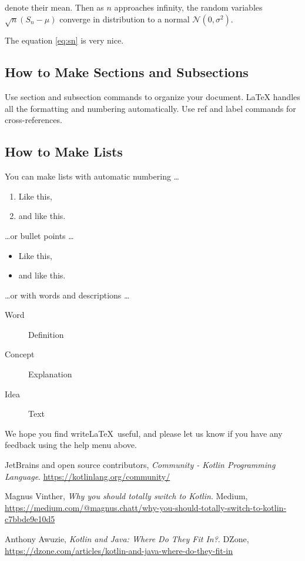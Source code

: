 \documentclass[a4paper]{article}
\begin{document}
denote their mean. Then as $n$ approaches infinity, the random variables $\sqrt{n}(S_n - \mu)$ converge in distribution to a normal $\mathcal{N}(0, \sigma^2)$.

The equation \ref{eq:sn} is very nice.

\subsection{How to Make Sections and Subsections}

Use section and subsection commands to organize your document. \LaTeX{} handles all the formatting and numbering automatically. Use ref and label commands for cross-references.

\subsection{How to Make Lists}

You can make lists with automatic numbering \dots

\begin{enumerate}
	\item Like this,
	\item and like this.
\end{enumerate}
\dots or bullet points \dots
\begin{itemize}
	\item Like this,
	\item and like this.
\end{itemize}
\dots or with words and descriptions \dots
\begin{description}
	\item[Word] Definition
	\item[Concept] Explanation
	\item[Idea] Text
\end{description}

We hope you find write\LaTeX\ useful, and please let us know if you have any feedback using the help menu above.

\begin{thebibliography}{999}
\raggedright

	JetBrains and open source contributors,
	\emph{Community - Kotlin Programming Language}.
	\url{https://kotlinlang.org/community/}

	Magnus Vinther,
	\emph{Why you should totally switch to Kotlin}. Medium,
	\url{https://medium.com/@magnus.chatt/why-you-should-totally-switch-to-kotlin-c7bbde9e10d5}

	Anthony Awuzie,
	\emph{Kotlin and Java: Where Do They Fit In?}. DZone,
	\url{https://dzone.com/articles/kotlin-and-java-where-do-they-fit-in}

\end{thebibliography}
\end{document}

